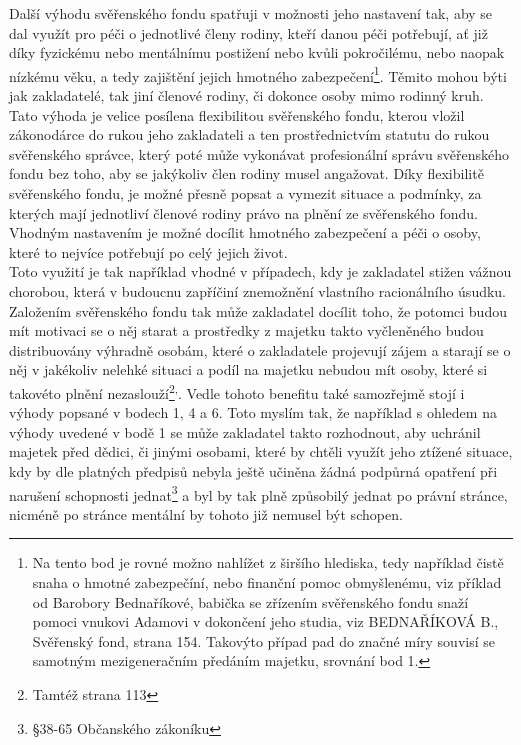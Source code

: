 \documentclass{article}
\begin{document}
 Další výhodu svěřenského fondu spatřuji v možnosti jeho nastavení tak, aby se dal využít pro péči o jednotlivé členy rodiny, kteří danou péči potřebují, ať již díky fyzickému nebo mentálnímu postižení nebo kvůli pokročilému, nebo naopak nízkému věku, a tedy zajištění jejich hmotného zabezpečení\footnote{Na tento bod je rovné možno nahlížet z širšího hlediska, tedy například čistě snaha o hmotné zabezpečíní, nebo finanční pomoc obmyšlenému, viz příklad od Barobory Bednaříkové, babička se zřízením svěřenského fondu snaží pomoci vnukovi Adamovi v dokončení jeho studia, viz BEDNAŘÍKOVÁ B., Svěřenský fond, strana 154. Takovýto případ pad do značné míry souvisí se samotným mezigeneračním předáním majetku, srovnání bod 1.}. Těmito mohou býti jak zakladatelé, tak jiní členové rodiny, či dokonce osoby mimo rodinný kruh. Tato výhoda je velice posílena flexibilitou svěřenského fondu, kterou vložil zákonodárce do rukou jeho zakladateli a ten prostřednictvím statutu do rukou svěřenského správce, který poté může vykonávat profesionální správu svěřenského fondu bez toho, aby se jakýkoliv člen rodiny musel angažovat. Díky flexibilitě svěřenského fondu, je možné přesně popsat a vymezit situace a podmínky, za kterých mají jednotliví členové rodiny právo na plnění ze svěřenského fondu. Vhodným nastavením je možné docílit hmotného zabezpečení a péči o osoby, které to nejvíce potřebují po celý jejich život.\\
 
 Toto využití je tak například vhodné v případech, kdy je zakladatel stižen vážnou chorobou, která v budoucnu zapříčiní znemožnění vlastního racionálního úsudku. Založením svěřenského fondu tak může zakladatel docílit toho, že potomci budou mít motivaci se o něj starat a prostředky z majetku takto vyčleněného budou distribuovány výhradně osobám, které o zakladatele projevují zájem a starají se o něj v jakékoliv nelehké situaci a podíl na majetku nebudou mít osoby, které si takovéto plnění nezaslouží\footnote{Tamtéž strana 113}\textsuperscript{,}. Vedle tohoto benefitu také samozřejmě stojí i výhody popsané v bodech 1, 4 a 6. Toto myslím tak, že například s ohledem na výhody uvedené v bodě 1 se může zakladatel takto rozhodnout, aby uchránil majetek před dědici, či jinými osobami, které by chtěli využít jeho ztížené situace, kdy by dle platných předpisů nebyla ještě učiněna žádná podpůrná opatření při narušení schopnosti jednat\footnote{§38-65 Občanského zákoníku} a byl by tak plně způsobilý jednat po právní stránce, nicméně po stránce mentální by tohoto již nemusel být schopen.\\
 
\end{document}
